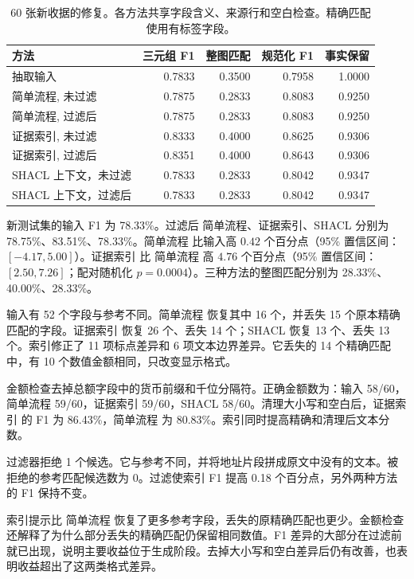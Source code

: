 \begin{table}[t]
\centering
\caption{60 张新收据的修复。各方法共享字段含义、来源行和空白检查。精确匹配使用有标签字段。}
\label{tab:receipt_followup}
\small
\begin{tabular}{lrrrr}
\toprule
方法 & 三元组 F1 & 整图匹配 & 规范化 F1 & 事实保留 \\
\midrule
抽取输入 & 0.7833 & 0.3500 & 0.7958 & 1.0000 \\
简单流程, 未过滤 & 0.7875 & 0.2833 & 0.8083 & 0.9250 \\
简单流程, 过滤后 & 0.7875 & 0.2833 & 0.8083 & 0.9250 \\
证据索引, 未过滤 & 0.8333 & 0.4000 & 0.8625 & 0.9306 \\
证据索引, 过滤后 & 0.8351 & 0.4000 & 0.8643 & 0.9306 \\
SHACL 上下文，未过滤 & 0.7833 & 0.2833 & 0.8042 & 0.9347 \\
SHACL 上下文，过滤后 & 0.7833 & 0.2833 & 0.8042 & 0.9347 \\
\bottomrule
\end{tabular}
\end{table}

新测试集的输入 F1 为 78.33\%。过滤后 简单流程、证据索引、SHACL 分别为 78.75\%、83.51\%、78.33\%。简单流程 比输入高 $0.42$ 个百分点（95\% 置信区间：$[-4.17,5.00]$）。证据索引 比 简单流程 高 $4.76$ 个百分点（95\% 置信区间：$[2.50,7.26]$；配对随机化 $p=0.0004$）。三种方法的整图匹配分别为 28.33\%、40.00\%、28.33\%。

输入有 52 个字段与参考不同。简单流程 恢复其中 16 个，并丢失 15 个原本精确匹配的字段。证据索引 恢复 26 个、丢失 14 个；SHACL 恢复 13 个、丢失 13 个。索引修正了 11 项标点差异和 6 项文本边界差异。它丢失的 14 个精确匹配中，有 10 个数值金额相同，只改变显示格式。

金额检查去掉总额字段中的货币前缀和千位分隔符。正确金额数为：输入 58/60，简单流程 59/60，证据索引 59/60，SHACL 58/60。清理大小写和空白后，证据索引 的 F1 为 86.43\%，简单流程 为 80.83\%。索引同时提高精确和清理后文本分数。

过滤器拒绝 1 个候选。它与参考不同，并将地址片段拼成原文中没有的文本。被拒绝的参考匹配候选数为 0。过滤使索引 F1 提高 0.18 个百分点，另外两种方法的 F1 保持不变。

索引提示比 简单流程 恢复了更多参考字段，丢失的原精确匹配也更少。金额检查还解释了为什么部分丢失的精确匹配仍保留相同数值。F1 差异的大部分在过滤前就已出现，说明主要收益位于生成阶段。去掉大小写和空白差异后仍有改善，也表明收益超出了这两类格式差异。

